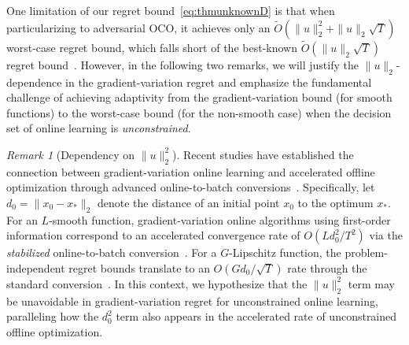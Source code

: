 \documentclass{article}
\theoremstyle{plain}
\theoremstyle{definition}
\theoremstyle{remark}
\newtheorem{remark}[theorem]{Remark}
\renewcommand{\tilde}{\widetilde}
\begin{document}

One limitation of our regret bound~\eqref{eq:thmunknownD} is that when particularizing to adversarial OCO, it achieves only an $\tilde{O}(\|u\|_2^2 + \|u\|_2 \sqrt{T})$ worst-case regret bound, which falls short of the best-known $\tilde{O}(\|u\|_2 \sqrt{T})$ regret bound~\cite{orabona2016coin, jacobsen2022parameter, mhammedi2020lipschitz}. However, in the following two remarks, we will justify the $\|u\|_2$-dependence in the gradient-variation regret and emphasize the fundamental challenge of achieving adaptivity from the gradient-variation bound (for smooth functions) to the worst-case bound (for the non-smooth case) when the decision set of online learning is \emph{unconstrained}. 

\begin{remark}[Dependency on $\|u\|_2^2$] 
\label{remark:dependence-u2}
Recent studies have established the connection between gradient-variation online learning and accelerated offline optimization through advanced online-to-batch conversions~\cite{LectureNote:AOpt25,NeurIPS'25:Holder}. Specifically, let $d_0 = \|x_0 - x_* \|_2$ denote the distance of an initial point $x_0$ to the optimum $x_*$. For an $L$-smooth function, gradient-variation online algorithms using first-order information correspond to an accelerated convergence rate of $O(L d_0^2/T^2)$ via the \emph{stabilized} online-to-batch conversion~\cite{kavis2019unixgrad}. For a $G$-Lipschitz function, the problem-independent regret bounds translate to an $O(G d_0/\sqrt{T})$ rate through the standard conversion~\cite{cesa2006prediction}. In this context, we hypothesize that the $\|u\|_2^2$ term may be unavoidable in gradient-variation regret for unconstrained online learning, paralleling how the $d_0^2$ term also appears in the accelerated rate of unconstrained offline optimization. %
\end{remark}
\end{document}
